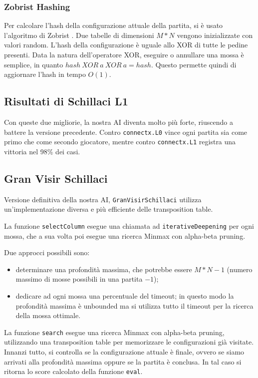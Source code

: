 \subsubsection{Zobrist Hashing}

Per calcolare l'hash della configurazione attuale della partita, si è usato l'algoritmo di Zobrist \cite{ZOB70}.
Due tabelle di dimensioni $M*N$ vengono inizializzate con valori random. L'hash della configurazione è uguale allo XOR di tutte le pedine presenti.
Data la natura dell'operatore XOR, eseguire o annullare una mossa è semplice, in quanto $hash\ XOR\ a\ XOR\  a = hash$.
Questo permette quindi di aggiornare l'hash in tempo $O(1)$.

\subsection{Risultati di Schillaci L1}

Con queste due migliorie, la nostra AI diventa molto più forte, riuscendo a battere la versione precedente.
Contro \verb!connectx.L0! vince ogni partita sia come primo che come secondo giocatore, mentre contro \verb!connectx.L1! registra una vittoria nel 98\% dei casi.

\subsection{Gran Visir Schillaci}

Versione definitiva della nostra AI, \verb!GranVisirSchillaci! utilizza un'implementazione diversa e più efficiente delle transposition table.

La funzione \verb!selectColumn! esegue una chiamata ad \verb!iterativeDeepening! per ogni mossa, che a sua volta poi esegue una ricerca Minmax con alpha-beta pruning.

Due approcci possibili sono:
\begin{itemize}
    \item determinare una profondità massima, che potrebbe essere $M*N-1$ (numero massimo di mosse possibili in una partita $-1$);
    \item dedicare ad ogni mossa una percentuale del timeout; in questo modo la profondità massima è unbounded ma si utilizza tutto il timeout per la ricerca della mossa ottimale.
\end{itemize}

La funzione \verb!search! esegue una ricerca Minmax con alpha-beta pruning, utilizzando una transposition table per memorizzare le configurazioni già visitate.
Innanzi tutto, si controlla se la configurazione attuale è finale, ovvero se siamo arrivati alla profondità massima oppure se la partita è conclusa. In tal caso si ritorna lo score calcolato della funzione \verb!eval!.

